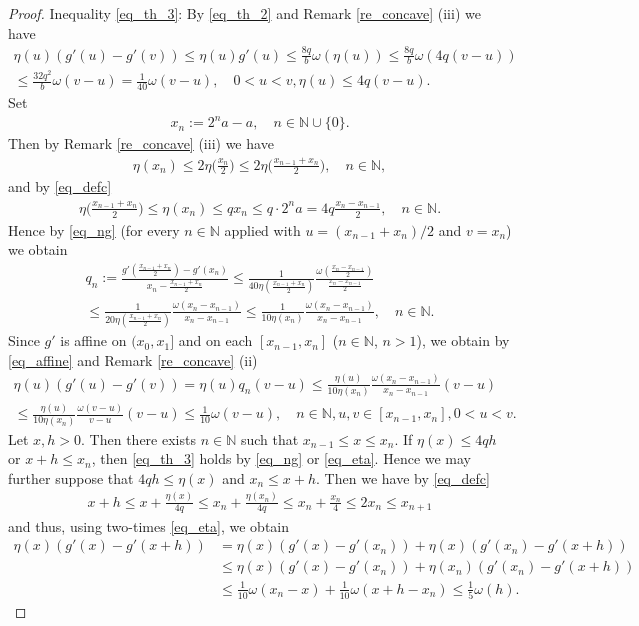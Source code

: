 \documentclass[10pt,a4paper]{amsart}
\theoremstyle{definition}
\newcommand{\N}{\mathbb{N}}
\begin{document}
\begin{proof}
Inequality \eqref{eq_th_3}: By \eqref{eq_th_2} and Remark \ref{re_concave} (iii) we have
\begin{multline}\label{eq_ng}
\eta(u)(g'(u)-g'(v))\leq\eta(u)g'(u)\leq\frac{8q}{b}\omega(\eta(u))\leq\frac{8q}{b}\omega(4q(v-u))\\\leq\frac{32q^2}{b}\omega(v-u)=\frac{1}{40}\omega(v-u),\quad 0<u<v,\eta(u)\leq 4q(v-u).
\end{multline}
Set
\begin{align*}
x_n:=2^na-a,\quad n\in\N\cup\lbrace 0\rbrace.
\end{align*}
Then by Remark \ref{re_concave} (iii) we have
\begin{align*}
\eta(x_n)\leq 2\eta\bigg(\frac{x_n}{2}\bigg)\leq 2\eta\bigg(\frac{x_{n-1}+x_n}{2}\bigg),\quad n\in\N,
\end{align*}
and by \eqref{eq_defc}
\begin{align*}
\eta\bigg(\frac{x_{n-1}+x_n}{2}\bigg)\leq\eta(x_n)\leq qx_n\leq q\cdot 2^na=4q\frac{x_n-x_{n-1}}{2},\quad n\in\N.
\end{align*}
Hence by \eqref{eq_ng} (for every $ n\in\N $ applied with $ u=(x_{n-1}+x_n)/2 $ and $ v=x_n $) we obtain
\begin{multline}\label{eq_affine}
q_n:=\frac{g'(\frac{x_{n-1}+x_n}{2})-g'(x_n)}{x_n-\frac{x_{n-1}+x_n}{2}}\leq
\frac{1}{40\eta(\frac{x_{n-1}+x_n}{2})}\frac{\omega(\frac{x_n-x_{n-1}}{2})}{\frac{x_n-x_{n-1}}{2}}\\
\leq\frac{1}{20\eta(\frac{x_{n-1}+x_n}{2})}\frac{\omega(x_n-x_{n-1})}{x_n-x_{n-1}}\leq\frac{1}{10\eta(x_n)}\frac{\omega(x_n-x_{n-1})}{x_n-x_{n-1}},\quad n\in\N.
\end{multline}
Since $ g' $ is affine on $ (x_0,x_1] $ and on each $ [x_{n-1},x_n] $ ($ n\in\N $, $ n>1 $), we obtain by \eqref{eq_affine} and Remark \ref{re_concave} (ii)
\begin{multline}\label{eq_eta}
\eta(u)(g'(u)-g'(v))=\eta(u)q_n(v-u)\leq\frac{\eta(u)}{10\eta(x_n)}\frac{\omega(x_n-x_{n-1})}{x_n-x_{n-1}}(v-u)\\
\leq\frac{\eta(u)}{10\eta(x_n)}\frac{\omega(v-u)}{v-u}(v-u)\leq\frac{1}{10}\omega(v-u),\quad n\in\N,u,v\in[x_{n-1},x_n],0<u<v.
\end{multline}
Let $ x,h>0 $. Then there exists $ n\in\N $ such that $ x_{n-1}\leq x\leq x_n $. If $ \eta(x)\leq4qh $ or $ x+h\leq x_n $, then \eqref{eq_th_3} holds by \eqref{eq_ng} or \eqref{eq_eta}. Hence we may further suppose that $ 4qh\leq\eta(x) $ and $ x_n\leq x+h $. Then we have by \eqref{eq_defc}
\begin{align*}
x+h\leq x+\frac{\eta(x)}{4q}\leq x_n+\frac{\eta(x_n)}{4q}\leq x_n+\frac{x_n}{4}\leq 2x_n\leq x_{n+1}
\end{align*}
and thus, using two-times \eqref{eq_eta}, we obtain
\begin{align*}
\eta(x)(g'(x)-g'(x+h))&=\eta(x)(g'(x)-g'(x_n))+\eta(x)(g'(x_n)-g'(x+h))\\
&\leq\eta(x)(g'(x)-g'(x_n))+\eta(x_n)(g'(x_n)-g'(x+h))\\
&\leq\frac{1}{10}\omega(x_n-x)+\frac{1}{10}\omega(x+h-x_n)\leq\frac{1}{5}\omega(h).
\end{align*}


\end{proof}
\end{document}
